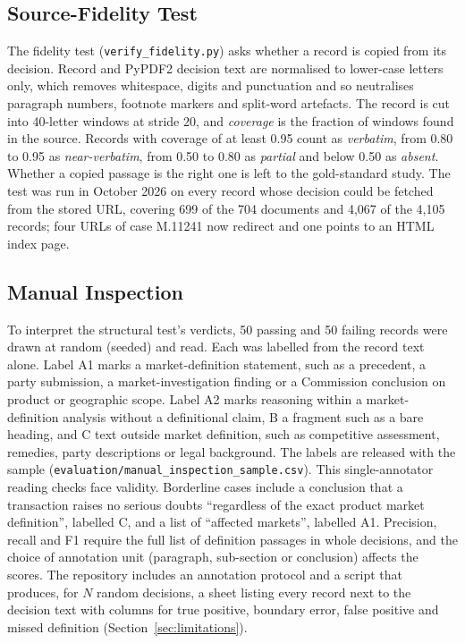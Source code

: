 \documentclass{IOS-Book-Article}
\begin{document}
\subsection{Source-Fidelity Test}

The fidelity test (\texttt{verify\_fidelity.py}) asks whether a record is
copied from its decision. Record and PyPDF2 decision text are normalised to
lower-case letters only, which removes whitespace, digits and punctuation and so
neutralises paragraph numbers, footnote markers and split-word artefacts. The
record is cut into 40-letter windows at stride 20, and \emph{coverage} is the
fraction of windows found in the source. Records with coverage of at least 0.95
count as \emph{verbatim}, from 0.80 to 0.95 as \emph{near-verbatim}, from 0.50
to 0.80 as \emph{partial} and below 0.50 as \emph{absent}. Whether a copied
passage is the right one is left to the gold-standard study. The test was run in
October 2026 on every record whose decision could be fetched from the stored
URL, covering 699 of the 704 documents and 4,067 of the 4,105 records; four URLs
of case M.11241 now redirect and one points to an HTML index page.

\subsection{Manual Inspection}

To interpret the structural test's verdicts, 50 passing and 50 failing records
were drawn at random (seeded) and read. Each was labelled from the record text
alone. Label A1 marks a market-definition statement, such as a precedent, a
party submission, a market-investigation finding or a Commission conclusion on
product or geographic scope. Label A2 marks reasoning within a
market-definition analysis without a definitional claim, B a fragment such as a
bare heading, and C text outside market definition, such as competitive
assessment, remedies, party descriptions or legal background. The labels are
released with the sample (\texttt{evaluation/manual\_inspection\_sample.csv}).
This single-annotator reading checks face validity. Borderline cases include a
conclusion that a transaction raises no serious doubts ``regardless of the exact
product market definition'', labelled C, and a list of ``affected markets'',
labelled A1. Precision, recall and F1 require the full list of definition
passages in whole decisions, and the choice of annotation unit (paragraph,
sub-section or conclusion) affects the scores. The repository includes an
annotation protocol and a script that produces, for $N$ random decisions, a
sheet listing every record next to the decision text with columns for true
positive, boundary error, false positive and missed definition
(Section~\ref{sec:limitations}).
\end{document}
